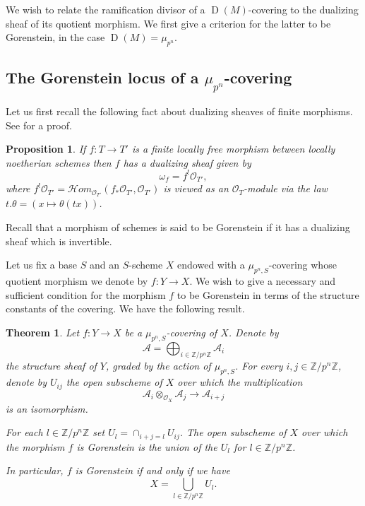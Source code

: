 \documentclass{amsart}
\newtheorem{theo}{Theorem}[section]
\newtheorem{prop}{Proposition}[section]
\theoremstyle{definition}
\theoremstyle{remark}
\begin{document}
We wish to relate the ramification divisor of a $\operatorname{D}(M)$-covering to the dualizing sheaf of its quotient morphism. We first give a criterion for the latter to be Gorenstein, in the case $\operatorname{D}(M) = \mu_{p^n}$. 

\subsection{The Gorenstein locus of a $\mu_{p^n}$-covering}

Let us first recall the following fact about dualizing sheaves of finite morphisms. See \cite[6.4.25]{Liu} for a proof.

\begin{prop}
\label{dual}
If $f : T {\longrightarrow} T'$ is a finite locally free morphism between locally noetherian schemes then $f$ has a dualizing sheaf given by \[ \omega_f = f^!{{\mathcal O}}_{T'}, \] where $f^!{{\mathcal O}}_{T'} = {{\mathcal H}} om_{{{\mathcal O}}_{T'}}(f_*{{\mathcal O}}_{T'},{{\mathcal O}}_{T'})$ is viewed as an ${{\mathcal O}}_{T}$-module via the law $t.\theta = (x \mapsto \theta(tx))$. 

\end{prop}
Recall that a morphism of schemes is said to be Gorenstein if it has a dualizing sheaf which is invertible. 

Let us fix a base $S$ and an $S$-scheme $X$ endowed with a $\mu_{p^n,S}$-covering whose quotient morphism we denote by $f : Y {\longrightarrow} X$. We wish to give a necessary and sufficient condition for the morphism $f$ to be Gorenstein in terms of the structure constants of the covering. We have the following result.  

\begin{theo}
Let $f : Y {\longrightarrow} X$ be a $\mu_{p^n,S}$-covering of $X$. Denote by \[{{\mathcal A}} = \displaystyle\bigoplus_{i \in {\mathbb{Z}} / p^n {\mathbb{Z}}} {{\mathcal A}}_i \] the structure sheaf of $Y$, graded by the action of $\mu_{p^n,S}$. For every $i,j \in {\mathbb{Z}}/p^n{\mathbb{Z}}$, denote by $U_{ij}$ the open subscheme of $X$ over which the multiplication \[ {{\mathcal A}}_i \otimes_{{{\mathcal O}}_X} {{\mathcal A}}_j {\longrightarrow} {{\mathcal A}}_{i+j} \] is an isomorphism.

For each $l \in {\mathbb{Z}}/ p^n {\mathbb{Z}}$ set $U_l = \cap_{i+j=l} U_{ij}$. The open subscheme of $X$ over which the morphism $f$ is Gorenstein is the union of the $U_l$ for $l \in {\mathbb{Z}} / p^n {\mathbb{Z}}$.

In particular, $f$ is Gorenstein if and only if we have \[ X = \displaystyle\bigcup_{l \in {\mathbb{Z}} / p^n {\mathbb{Z}}} U_l.\]

\end{theo}
\end{document}
